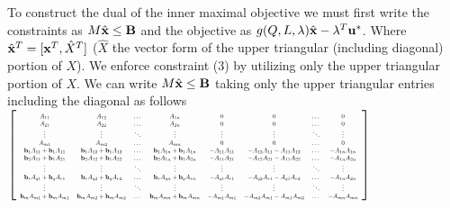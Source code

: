 To construct the dual of the inner maximal objective we must first write the constraints as $M\hat{\mathbf{x}} \leq \mathbf{B}$ and the objective as $g(Q,L,\lambda)\hat{\mathbf{x}}-\lambda^T\mathbf{u}^*$. Where $\hat{\mathbf{x}}^T=[\mathbf{x}^T,\hat{X}^T]$ ($\hat{X}$ the vector form of the upper triangular (including diagonal) portion of $X$). 
We enforce constraint (3) by utilizing only the upper triangular portion of $X$. We can write $M\hat{\mathbf{x}}\leq \mathbf{B}$ taking only the upper triangular entries including the diagonal as follows\\

$\left[
\scalebox{0.5}{%
	\begin{tabular}{ c c c c c c c c}
	$A_{11}$ & $A_{12}$ & $\dots$ & $A_{1n}$ & $0$ & $0$ & $\dots$ & $0$ \\ 
	$A_{21}$ & $A_{22}$ & $\dots$ & $A_{2n}$ & $0$ & $0$ & $\dots$ & $0$ \\  
	$\vdots$ & $\vdots$ & $\ddots$ & $\vdots$ & $\vdots$ & $\vdots$ & $\ddots$ & $\vdots$\\
	$A_{m1}$ & $A_{m2}$ & $\dots$ & $A_{mn}$ & $0$ & $0$ & $\dots$ & $0$ \\
	$\vb_1A_{11}+\vb_1A_{11}$ & $\vb_1A_{12}+\vb_1A_{12}$ & $\dots$ & $\vb_1A_{1n}+\vb_1A_{1n}$ & $-A_{11}A_{11}$ & $-A_{12}A_{11}-A_{11}A_{12}$ & $\dots$ & $-A_{1n}A_{1n}$ \\ 
	$\vb_2A_{11}+\vb_1A_{21}$ & $\vb_2A_{12}+\vb_1A_{22}$ & $\dots$ & $\vb_2A_{1n}+\vb_1A_{2n}$ & $-A_{11}A_{21}$ & $-A_{12}A_{21}-A_{11}A_{22}$ & $\dots$ & $-A_{1n}A_{2n}$ \\ 
	$\vdots$ & $\vdots$ & $\ddots$ & $\vdots$ & $\vdots$ & $\vdots$ & $\ddots$ & $\vdots$\\
	$\vb_rA_{q1}+\vb_qA_{r1}$ & $\vb_rA_{q2}+\vb_qA_{r2}$ & $\dots$ & $\vb_rA_{qn}+\vb_qA_{rn}$ & $-A_{q1}A_{r1}$ & $-A_{q2}A_{r1}-A_{q1}A_{r2}$ & $\dots$ & $-A_{1n}A_{2n}$ \\ 
	$\vdots$ & $\vdots$ & $\ddots$ & $\vdots$ & $\vdots$ & $\vdots$ & $\ddots$ & $\vdots$\\
	$\vb_mA_{m1}+\vb_mA_{m1}$ & $\vb_mA_{m2}+\vb_mA_{m2}$ & $\dots$ & $\vb_mA_{mn}+\vb_mA_{mn}$ & $-A_{m1}A_{m1}$ & $-A_{m2}A_{m1}-A_{m1}A_{m2}$ & $\dots$ & $-A_{mn}A_{mn}$ 
	\end{tabular}%
} 
\right]$
